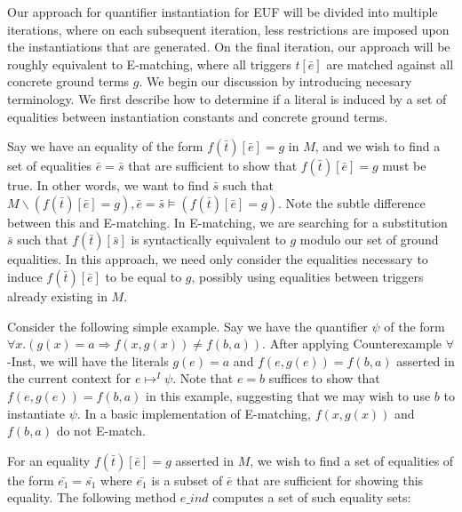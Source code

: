 \documentclass{llncs}
\begin{document}
Our approach for quantifier instantiation for EUF will be divided into multiple iterations, where on each subsequent iteration, less restrictions are imposed upon the instantiations that are generated.
On the final iteration, our approach will be roughly equivalent to E-matching, where all triggers $t[\bar{e}]$ are matched against all concrete ground terms $g$.
We begin our discussion by introducing necesary terminology.
We first describe how to determine if a literal is induced by a set of equalities between instantiation constants and concrete ground terms.

Say we have an equality of the form $f( \bar{t} )[\bar{e}] = g$ in $M$, and we wish to find a set of equalities $\bar{e} = \bar{s}$ that are sufficient to show that $f( \bar{t} )[\bar{e}] = g$ must be true.
In other words, we want to find $\bar{s}$ such that $M \backslash (f( \bar{t} )[\bar{e}] = g), \bar{e} = \bar{s} \models (f( \bar{t} )[\bar{e}] = g)$.
Note the subtle difference between this and E-matching.
In E-matching, we are searching for a substitution $\bar{s}$ such that $f( \bar{t} )[\bar{s}]$ is syntactically equivalent to $g$ modulo our set of ground equalities.
In this approach, we need only consider the equalities necessary to induce $f( \bar{t} )[\bar{e}]$ to be equal to $g$, possibly using equalities between triggers already existing in $M$.

Consider the following simple example.
Say we have the quantifier $\psi$ of the form $\forall x. (g(x) = a \Rightarrow f( x, g( x ) ) \neq f( b, a ))$.
After applying Counterexample $\forall$-Inst, we will have the literals $g(e) = a$ and $f( e, g( e ) ) = f( b, a )$ asserted in the current context for $e \mapsto^I \psi$.
Note that $e = b$ suffices to show that $f( e, g( e ) ) = f( b, a )$ in this example, suggesting that we may wish to use $b$ to instantiate $\psi$.
In a basic implementation of E-matching, $f( x, g( x ) )$ and $f( b, a )$ do not E-match.

For an equality $f( \bar{t} )[\bar{e}] = g$ asserted in $M$, we wish to find a set of equalities of the form $\bar{e_1} = \bar{s_1}$ where $\bar{e_1}$ is a subset of $\bar{e}$ that are sufficient for showing this equality.
The following method $e\_ind$ computes a set of such equality sets:
\end{document}
